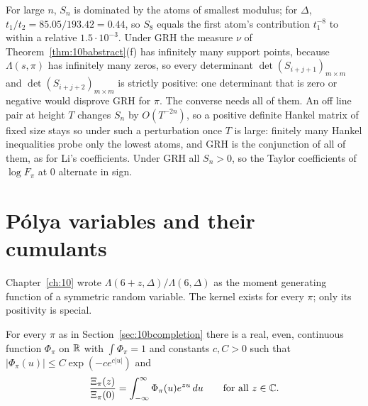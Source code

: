 \begin{remark}\label{rem:10bfinite}
For large $n$, $S_n$ is dominated by the atoms of smallest modulus; for $\Delta$, $t_1/t_2 = 85.05/193.42 = 0.44$, so $S_8$ equals the first atom's contribution $t_1^{-8}$ to within a relative $1.5\cdot10^{-3}$. Under GRH the measure $\nu$ of Theorem~\ref{thm:10babstract}(f) has infinitely many support points, because $\Lambda(s,\pi)$ has infinitely many zeros, so every determinant $\det(S_{i+j+1})_{m\times m}$ and $\det(S_{i+j+2})_{m\times m}$ is strictly positive: one determinant that is zero or negative would disprove GRH for $\pi$. The converse needs all of them. An off line pair at height $T$ changes $S_n$ by $O(T^{-2n})$, so a positive definite Hankel matrix of fixed size stays so under such a perturbation once $T$ is large: finitely many Hankel inequalities probe only the lowest atoms, and GRH is the conjunction of all of them, as for Li's coefficients. Under GRH all $S_n>0$, so the Taylor coefficients of $\log F_\pi$ at $0$ alternate in sign.
\end{remark}

\section{P\'olya variables and their cumulants}

Chapter~\ref{ch:10} wrote $\Lambda(6+z,\Delta)/\Lambda(6,\Delta)$ as the moment generating function of a symmetric random variable. The kernel exists for every $\pi$; only its positivity is special.

\begin{lemma}\label{lem:10bkernel}
For every $\pi$ as in Section~\ref{sec:10bcompletion} there is a real, even, continuous function $\Phi_\pi$ on $\mathbb{R}$ with $\int\Phi_\pi = 1$ and constants $c,C>0$ such that $|\Phi_\pi(u)|\le C\exp(-ce^{c|u|})$ and
\[
\frac{\Xi_\pi(z)}{\Xi_\pi(0)} = \int_{-\infty}^\infty\Phi_\pi(u)e^{zu}\,du\qquad\text{for all }z\in\mathbb{C} .
\]
\end{lemma}

